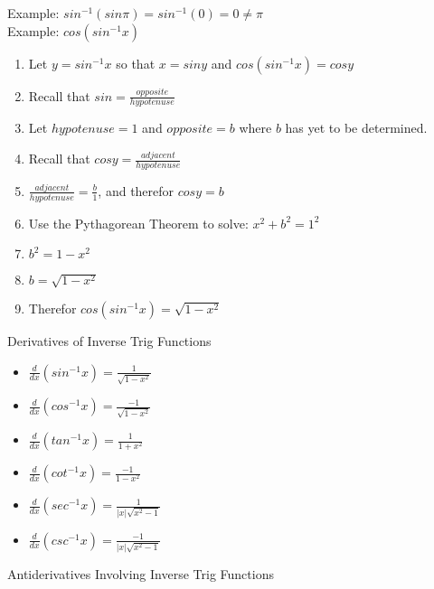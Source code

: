 \documentclass{article}
\begin{document}
\noindent
Example: $sin^{-1}(sin\pi) = sin^{-1}(0) = 0 \neq \pi$\\

\noindent
Example: $cos(sin^{-1}x)$
\begin{enumerate}
  \item {Let $y = sin^{-1}x$ so that $x = siny$ and $cos(sin^{-1}x) = cosy$\\}
  \item {Recall that $sin = \frac{opposite}{hypotenuse}$\\}
  \item {Let $hypotenuse = 1$ and $opposite = b$ where $b$ has yet to be determined.\\}
  \item {Recall that $cosy = \frac{adjacent}{hypotenuse}$\\}
  \item {$\frac{adjacent}{hypotenuse} = \frac{b}{1}$, and therefor $cosy = b$\\}
  \item {Use the Pythagorean Theorem to solve: $x^2 + b^2 = 1^2$\\}
  \item {$b^2 = 1 - x^2$\\}
  \item {$b = \sqrt{1 - x^2}$\\}
  \item {Therefor $cos(sin^{-1}x) = \sqrt{1 - x^2}$}
\end{enumerate}

\noindent
\Large Derivatives of Inverse Trig Functions
\normalsize
\noindent

\begin{itemize}
  \item {
  $\frac{d}{dx}(sin^{-1}x) = \frac{1}{\sqrt{1-x^2}}$
  }
  \item {
  $\frac{d}{dx}(cos^{-1}x) = \frac{-1}{\sqrt{1-x^2}}$
  }
  \item {
  $\frac{d}{dx}(tan^{-1}x) = \frac{1}{1+x^2}$
  }
  \item {
  $\frac{d}{dx}(cot^{-1}x) = \frac{-1}{1-x^2}$
  }
  \item {
  $\frac{d}{dx}(sec^{-1}x) = \frac{1}{|x|\sqrt{x^2-1}}$
  }
  \item {
  $\frac{d}{dx}(csc^{-1}x) = \frac{-1}{|x|\sqrt{x^2-1}}$
  }
\end{itemize}

\noindent
\Large Antiderivatives Involving Inverse Trig Functions
\normalsize
\noindent
\end{document}
